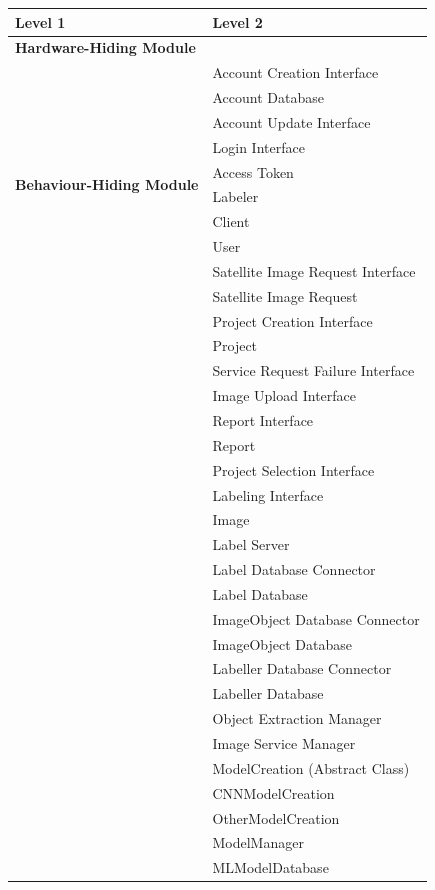 \documentclass[12pt, titlepage]{article}
\begin{document}
\begin{table}[h!]
  \centering
  \begin{tabular}{p{} p{}}
  \toprule
  \textbf{Level 1} & \textbf{Level 2}\\
  \midrule
  
  \textbf{Hardware-Hiding Module} & ~ \\
  \midrule
  
  \multirow{10}{0.3\textwidth}{\textbf{Behaviour-Hiding Module}} 
   & Account Creation Interface\\
   & Account Database\\
   & Account Update Interface\\
   & Login Interface\\
   & Access Token\\
   & Labeler\\
   & Client\\
   & User\\
   & Satellite Image Request Interface\\
   & Satellite Image Request\\
   & Project Creation Interface\\
   & Project\\
   & Service Request Failure Interface\\
   & Image Upload Interface\\
   & Report Interface\\
   & Report\\
   & Project Selection Interface\\
   & Labeling Interface\\
   & Image\\
   & Label Server\\
   & Label Database Connector\\
   & Label Database\\
   & ImageObject Database Connector\\
   & ImageObject Database\\
   & Labeller Database Connector\\
   & Labeller Database\\
   & Object Extraction Manager\\
   & Image Service Manager\\
   & ModelCreation (Abstract Class)\\
   & CNNModelCreation\\
   & OtherModelCreation\\
   & ModelManager\\
   & MLModelDatabase\\
  \midrule
  

\end{tabular}
\end{table}
\end{document}
